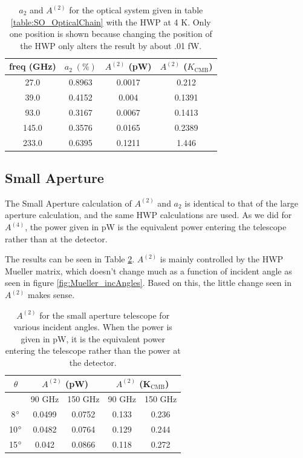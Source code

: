 \documentclass{article}
\theoremstyle{remark}
\renewcommand{\t}[1]{\text{#1}}
\newcommand{\A}[1]{A^{(#1)}}
\begin{document}
\begin{table}
\centering
\begin{tabular}{ |c|c|c|c|} 
	\hline
	freq (GHz) &  $a_2\; (\%)$ & $\A2$ (pW)  & $\A2$ ($K_\t{CMB}$) \\ \hline
	27.0  & 0.8963 & 0.0017 & 0.212 \\ 
	39.0  & 0.4152 & 0.004  & 0.1391\\ 
	93.0  & 0.3167 & 0.0067 & 0.1413\\ 
	145.0 & 0.3576 & 0.0165 & 0.2389\\ 
	233.0 & 0.6395 & 0.1211 & 1.446 \\ 
	\hline	
\end{tabular}



\caption{ $a_2$ and $\A2$ for the optical system given in table \ref{table:SO_OpticalChain} with the HWP at 4 K. 
Only one position is shown because changing the position of the HWP only alters the result by about .01 fW. 
}
\label{table:SO_a2}
\end{table}



\subsection{Small Aperture}
The Small Aperture calculation of $\A2$ and $a_2$ is identical to that of the large aperture calculation,
and the same HWP calculations are used. 
As we did for $\A4$, the power given in pW is the equivalent power entering the telescope rather than at the detector. 

The results can be seen in Table \ref{table:smallAp_A2}.
$\A2$ is mainly controlled by the HWP Mueller matrix, which doesn't change much as a function of incident angle as seen in figure \ref{fig:Mueller_incAngles}.
Based on this, the little change seen in $\A2$ makes sense.

 \begin{table}[h]
\centering

\begin{tabular}{|c|c|c|c|c|}
\hline
$\theta$ & \multicolumn{2}{|c|}{$\A2 $ (pW)}&  \multicolumn{2}{|c|}{$\A2 $ (K$_\text{CMB}$)} \\
\hline
      & 90 GHz   & 150 GHz  & 90 GHz & 150 GHz         \\
\hline
8$\degree$   & 0.0499 & 0.0752 & 0.133  & 0.236\\
10$\degree$  & 0.0482 & 0.0764 & 0.129  & 0.244\\
15$\degree$  & 0.042  & 0.0866 & 0.118  & 0.272\\\hline
\end{tabular}
\caption{ $\A2$ for the small aperture telescope for various incident angles. 
When the power is given in pW, it is the equivalent power entering the telescope rather than the power at the detector.
}
\label{table:smallAp_A2}
\end{table}
\end{document}
